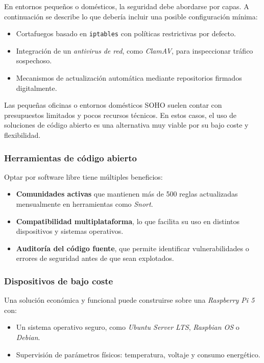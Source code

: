 \documentclass[11pt,a4paper,twoside]{report}
\begin{document}
En entornos pequeños o domésticos, la seguridad debe abordarse por capas. A continuación se describe lo que debería incluir una posible configuración mínima:

\begin{itemize}
	\item Cortafuegos basado en \texttt{iptables} con políticas restrictivas por defecto.
	\item Integración de un \textit{antivirus de red}, como \textit{ClamAV}, para inspeccionar tráfico sospechoso.
	\item Mecanismos de actualización automática mediante repositorios firmados digitalmente.
\end{itemize}

Las pequeñas oficinas o entornos domésticos SOHO suelen contar con presupuestos limitados y pocos recursos técnicos. En estos casos, el uso de soluciones de código abierto es una alternativa muy viable por su bajo coste y flexibilidad.

\subsubsection{Herramientas de código abierto}

Optar por software libre tiene múltiples beneficios:

\begin{itemize}
	\item \textbf{Comunidades activas} que mantienen más de 500 reglas actualizadas mensualmente en herramientas como \textit{Snort}.
	\item \textbf{Compatibilidad multiplataforma}, lo que facilita su uso en distintos dispositivos y sistemas operativos.
	\item \textbf{Auditoría del código fuente}, que permite identificar vulnerabilidades o errores de seguridad antes de que sean explotados.
\end{itemize}


\subsubsection{Dispositivos de bajo coste}

Una solución económica y funcional puede construirse sobre una \textit{Raspberry Pi 5} con:

\begin{itemize}
	\item Un sistema operativo seguro, como \textit{Ubuntu Server LTS}, \textit{Raspbian OS} o \textit{Debian}.
	\item Supervisión de parámetros físicos: temperatura, voltaje y consumo energético.
\end{itemize}
\end{document}
